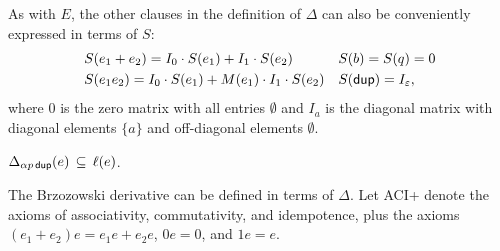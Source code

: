 \documentclass{article}
\newcommand\pdup{\mathop{\mathsf{dup}}}
\newcommand\STD{\Delta}
\newcommand\STDM{S}
\begin{document}
As with $E$, the other clauses in the definition of $\STD$ can also be conveniently expressed in terms of $\STDM$:
\begin{align*}
& \STDM(e_1+e_2) = I_0\cdot\STDM(e_1) + I_1\cdot\STDM(e_2) && \STDM(b) = \STDM(q) = 0\\
& \STDM(e_1e_2) = I_0\cdot\STDM(e_1) + M(e_1)\cdot I_1\cdot\STDM(e_2) && \STDM(\pdup) = I_\eps,
\end{align*}
where $0$ is the zero matrix with all entries $\emptyset$ and $I_a$ is the diagonal matrix with diagonal elements $\{a\}$ and off-diagonal elements $\emptyset$.

\begin{lemma}
\label{eq:Deltacl}
$\STD_{\alpha p\pdup}(e) \subs \ell(e)$.
\end{lemma}

The Brzozowski derivative can be defined in terms of $\STD$.
Let ACI+ denote the axioms of associativity, commutativity, and idempotence, plus the axioms $(e_1+e_2)e = e_1e + e_2e$, $0e = 0$, and $1e = e$.
\end{document}
